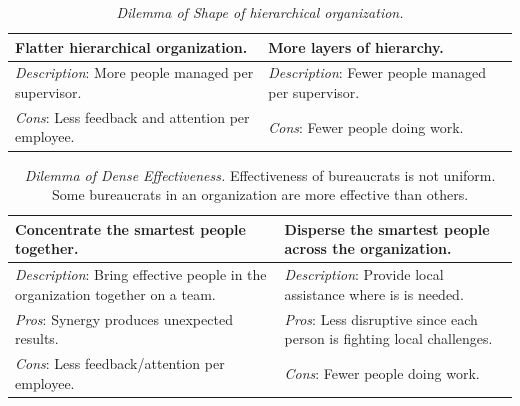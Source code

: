 \begin{center}
\begin{table}[H] %
\begin{tabular}{ | m{\dilemmatablewidth}| m{\dilemmatablewidth} | } 
  \hline
  \textbf{Flatter hierarchical organization.} &
  \textbf{More layers of hierarchy.} \\ 
  \hline
  \textit{Description}: More people managed per supervisor. & 
  \textit{Description}: Fewer people managed per supervisor. \\ 
  \hline
  \textit{Cons}: Less feedback and attention per employee. & 
  \textit{Cons}: Fewer people doing work. \\  
  \hline
\end{tabular}
\caption{
\textit{Dilemma of Shape of hierarchical organization.}
}
\label{table:people-per-supervisor}
\end{table}
\end{center}



\begin{center}
\begin{table}[H] %
\begin{tabular}{ | m{\dilemmatablewidth}| m{\dilemmatablewidth} | } 
  \hline
  \textbf{Concentrate the smartest people together.} &
  \textbf{Disperse the smartest people across the organization.} \\ 
  \hline
  \textit{Description}: Bring effective people in the organization together on a team. & 
  \textit{Description}: Provide local assistance where is is needed. \\ 
  \hline
  \textit{Pros}: Synergy produces unexpected results. & 
  \textit{Pros}: Less disruptive since each person is fighting local challenges. \\  
  \hline
  \textit{Cons}: Less feedback/attention per employee. & 
  \textit{Cons}: Fewer people doing work. \\  
  \hline
\end{tabular}
\caption{
\textit{Dilemma of Dense Effectiveness.}
Effectiveness of bureaucrats is not uniform. Some bureaucrats in an organization are more effective than others.
}
\label{table:dense-effectiveness}
\end{table}
\end{center}



